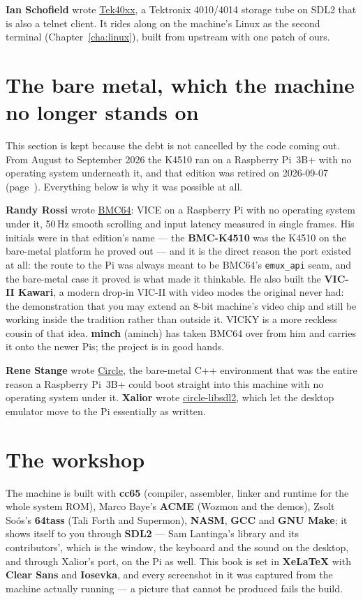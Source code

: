 \textbf{Ian Schofield} wrote
\href{https://github.com/ijschofield/Tek40xx}{Tek40xx}, a Tektronix
4010/4014 storage tube on SDL2 that is also a telnet client. It rides
along on the machine's Linux as the second terminal
(Chapter~\ref{cha:linux}), built from upstream with one patch of ours.

\section{The bare metal, which the machine no longer stands on}
This section is kept because the debt is not cancelled by the code
coming out. From August to September 2026 the K4510 ran on a Raspberry
Pi~3B+ with no operating system underneath it, and that edition was
retired on 2026-09-07 (page~\pageref{sec:names}). Everything below is
why it was possible at all.

\textbf{Randy Rossi} wrote
\href{https://github.com/randyrossi/bmc64}{BMC64}: VICE on a Raspberry
Pi with no operating system under it, 50\,Hz smooth scrolling and input
latency measured in single frames. His initials were in that edition's
name --- the \textbf{BMC-K4510} was the K4510 on the bare-metal platform
he proved out --- and it is the direct reason the port existed at all:
the route to the Pi was always meant to be BMC64's \verb|emux_api| seam,
and the bare-metal case it proved is what made it thinkable. He also built the \textbf{VIC-II Kawari}, a
modern drop-in VIC-II with video modes the original never had: the
demonstration that you may extend an 8-bit machine's video chip and
still be working inside the tradition rather than outside it. VICKY is
a more reckless cousin of that idea. \textbf{minch} (aminch) has taken
BMC64 over from him and carries it onto the newer Pis; the project is
in good hands.

\textbf{Rene Stange} wrote \href{https://github.com/rsta2/circle}{Circle},
the bare-metal C++ environment that was the entire reason a Raspberry
Pi~3B+ could boot straight into this machine with no operating system
under it. \textbf{Xalior} wrote
\href{https://github.com/Xalior/circle-libsdl2}{circle-libsdl2}, which
let the desktop emulator move to the Pi essentially as written.

\section{The workshop}
The machine is built with \textbf{cc65} (compiler, assembler, linker
and runtime for the whole system ROM), Marco Baye's \textbf{ACME}
(Wozmon and the demos), Zsolt Soós's \textbf{64tass} (Tali Forth
and Supermon), \textbf{NASM}, \textbf{GCC} and \textbf{GNU Make}; it shows itself to you through
\textbf{SDL2} --- Sam Lantinga's library and its contributors', which
is the window, the keyboard and the sound on the desktop, and through
Xalior's port, on the Pi as well. This book is set in \textbf{XeLaTeX} with
\textbf{Clear Sans} and \textbf{Iosevka}, and every screenshot in it
was captured from the machine actually running --- a picture that
cannot be produced fails the build.

